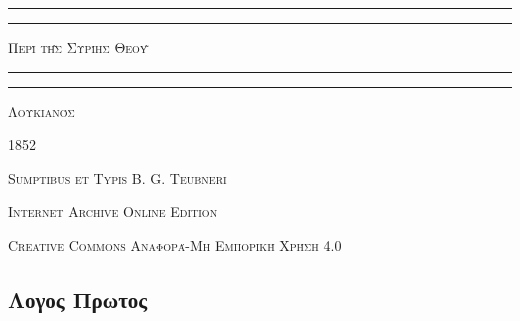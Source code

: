 \documentclass[a4paper, 11pt, oneside, polutonikogreek, german]{article}
\begin{document}
\bfseries
{}
\begin{titlepage} %
	\centering %


	\rule{\textwidth}{1.6pt}\vspace*{-\baselineskip}\vspace*{2pt} %
	\rule{\textwidth}{0.4pt} %
	
	\vspace{1\baselineskip} %
	
	{\scshape\Huge Περὶ τῆς Συρίης Θεοῦ}
	
	\vspace{1\baselineskip} %

	\rule{\textwidth}{0.4pt}\vspace*{-\baselineskip}\vspace{3.2pt} %
	\rule{\textwidth}{1.6pt} %
	
	\vspace{1\baselineskip} %
	
	
	{\scshape \Large Λουκιανός}
 
        \vspace{0.5\baselineskip}
	
	\vspace*{1\baselineskip} %
	
        {\scshape \normalsize } %

        \vspace*{\fill}    

	\vspace{1\baselineskip}

	{\small\scshape 1852}
	
	{\small\scshape{Sumptibus et Typis B. G. Teubneri}}
	
	\vspace{0.5\baselineskip} %

        \scshape Internet Archive Online Edition%
    
	{\scshape\small Creative Commons Αναφορά-Μη Εμπορική Χρήση 4.0} %
\end{titlepage}
\setlength{\parskip}{1mm plus1mm minus1mm}
\clearpage
\large
\begin{center}
\section{Λογος Πρωτος}
\end{center}
\end{document}
